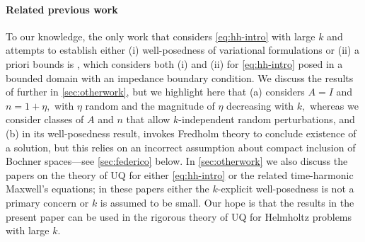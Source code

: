  \paragraph{Related previous work} To our knowledge, the only work that considers \eqref{eq:hh-intro} with large $k$ and attempts to establish either (i) well-posedness of variational formulations or (ii) a priori bounds is \cite{FeLiLo:15}, which considers both (i) and (ii) for \eqref{eq:hh-intro} posed in a bounded domain with an impedance boundary condition. We discuss the results of \cite{FeLiLo:15} further in \cref{sec:otherwork}, but we highlight here that (a) \cite{FeLiLo:15} considers $A=I$ and $n=1+\eta,$ with $\eta$ random and the magnitude of $\eta$ decreasing with $k,$  whereas we consider classes of $A$ and $n$ that allow $k$-independent random perturbations, and (b) in its well-posedness result, \cite{FeLiLo:15}  invokes Fredholm theory to conclude existence of a solution, but this relies on an incorrect assumption about compact inclusion of Bochner spaces---see \cref{sec:federico} below. In \cref{sec:otherwork} we also discuss the papers \cite{BuGh:14,JeSc:16,JeScZe:17,HiScScSc:15} on the theory of UQ for either \eqref{eq:hh-intro} or the related time-harmonic Maxwell's equations; in these papers either the $k$-explicit well-posedness is not a primary concern or $k$ is assumed to be small. Our hope is that the results in the present paper can be used in the rigorous theory of UQ for Helmholtz problems with large $k.$
 
